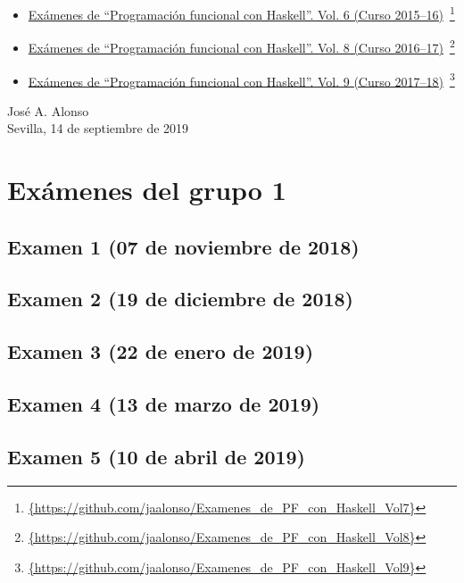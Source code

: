 \documentclass[a4paper,12pt,twoside]{book}
\begin{document}
\begin{itemize}
\item
  \href{https://github.com/jaalonso/Examenes_de_PF_con_Haskell_Vol7}
  {Exámenes de ``Programaci\'on funcional con Haskell''.
    Vol. 6 (Curso 2015--16)}\
    \footnote{\url{{https://github.com/jaalonso/Examenes_de_PF_con_Haskell_Vol7}}}

\item
  \href{https://github.com/jaalonso/Examenes_de_PF_con_Haskell_Vol8}
  {Exámenes de ``Programaci\'on funcional con Haskell''.
    Vol. 8 (Curso 2016--17)}\
    \footnote{\url{{https://github.com/jaalonso/Examenes_de_PF_con_Haskell_Vol8}}}

\item
  \href{https://github.com/jaalonso/Examenes_de_PF_con_Haskell_Vol9}
  {Exámenes de ``Programaci\'on funcional con Haskell''.
    Vol. 9 (Curso 2017--18)}\
    \footnote{\url{{https://github.com/jaalonso/Examenes_de_PF_con_Haskell_Vol9}}}

\end{itemize}
     
\begin{flushright}
  José A. Alonso \\
  Sevilla, 14 de septiembre de 2019
\end{flushright}

\chapter{Exámenes del grupo 1}
\section{Examen 1 (07 de noviembre de 2018)}
\section{Examen 2 (19 de diciembre de 2018)}
\section{Examen 3 (22 de enero de 2019)}
 \label{examen_18_19_1_3}
\section{Examen 4 (13 de marzo de 2019)}
\section{Examen 5 (10 de abril de 2019)}
\end{document}
